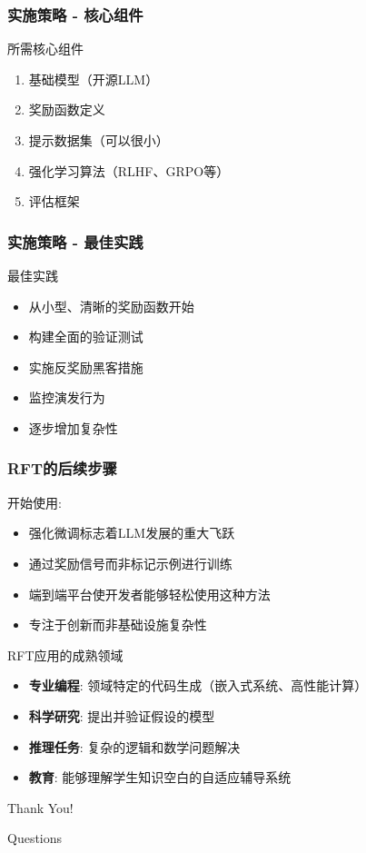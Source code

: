 \documentclass[aspectratio=169]{beamer}
\begin{document}
\begin{frame}[shrink=10]
	\frametitle{实施策略 - 核心组件}
	\begin{block}{所需核心组件}
		\begin{enumerate}
			\item 基础模型（开源LLM）
			\item 奖励函数定义
			\item 提示数据集（可以很小）
			\item 强化学习算法（RLHF、GRPO等）
			\item 评估框架
		\end{enumerate}
	\end{block}
\end{frame}

\begin{frame}[shrink=10]
	\frametitle{实施策略 - 最佳实践}
	\begin{block}{最佳实践}
		\begin{itemize}
			\item 从小型、清晰的奖励函数开始
			\item 构建全面的验证测试
			\item 实施反奖励黑客措施
			\item 监控演发行为
			\item 逐步增加复杂性
		\end{itemize}
	\end{block}
\end{frame}

\begin{frame}[shrink=10]
	\frametitle{RFT的后续步骤}
	\begin{block}{开始使用:}
		\begin{itemize}
			\item 强化微调标志着LLM发展的重大飞跃
			\item 通过奖励信号而非标记示例进行训练
			\item 端到端平台使开发者能够轻松使用这种方法
			\item 专注于创新而非基础设施复杂性
		\end{itemize}
	\end{block}
	\begin{block}{RFT应用的成熟领域}
		\begin{itemize}
			\item \textbf{专业编程}: 领域特定的代码生成（嵌入式系统、高性能计算）
			\item \textbf{科学研究}: 提出并验证假设的模型
			\item \textbf{推理任务}: 复杂的逻辑和数学问题解决
			\item \textbf{教育}: 能够理解学生知识空白的自适应辅导系统
		\end{itemize}
	\end{block}
\end{frame}

\begin{frame}{}
	\begin{center}
		\LARGE Thank You!
	\end{center}
	\begin{center}
		\large Questions
	\end{center}
\end{frame}
\end{document}
